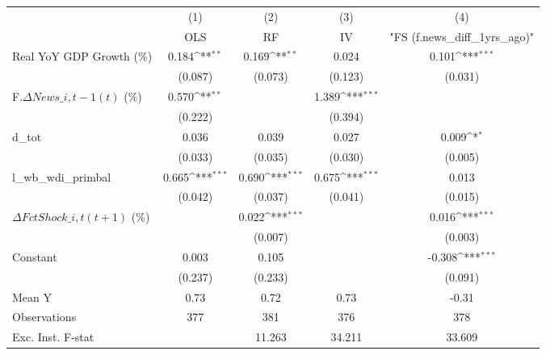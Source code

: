 {
\def\sym#1{\ifmmode^{#1}\else\(^{#1}\)\fi}
\begin{tabular}{l*{4}{c}}
\toprule
                    &\multicolumn{1}{c}{(1)}&\multicolumn{1}{c}{(2)}&\multicolumn{1}{c}{(3)}&\multicolumn{1}{c}{(4)}\\
                    &\multicolumn{1}{c}{OLS}&\multicolumn{1}{c}{RF}&\multicolumn{1}{c}{IV}&\multicolumn{1}{c}{ "FS (f.news\_diff\_1yrs\_ago)" }\\
\midrule
Real YoY GDP Growth (\%)&       0.184\sym{**} &       0.169\sym{**} &       0.024         &       0.101\sym{***}\\
                    &     (0.087)         &     (0.073)         &     (0.123)         &     (0.031)         \\
\addlinespace
F.$ \Delta News\_{i,t-1}(t)$ (\%)&       0.570\sym{**} &                     &       1.389\sym{***}&                     \\
                    &     (0.222)         &                     &     (0.394)         &                     \\
\addlinespace
d\_tot               &       0.036         &       0.039         &       0.027         &       0.009\sym{*}  \\
                    &     (0.033)         &     (0.035)         &     (0.030)         &     (0.005)         \\
\addlinespace
l\_wb\_wdi\_primbal    &       0.665\sym{***}&       0.690\sym{***}&       0.675\sym{***}&       0.013         \\
                    &     (0.042)         &     (0.037)         &     (0.041)         &     (0.015)         \\
\addlinespace
$ \Delta FctShock\_{i,t}(t+1)$ (\%)&                     &       0.022\sym{***}&                     &       0.016\sym{***}\\
                    &                     &     (0.007)         &                     &     (0.003)         \\
\addlinespace
Constant            &       0.003         &       0.105         &                     &      -0.308\sym{***}\\
                    &     (0.237)         &     (0.233)         &                     &     (0.091)         \\
\midrule
Mean Y              &        0.73         &        0.72         &        0.73         &       -0.31         \\
Observations        &         377         &         381         &         376         &         378         \\
Exc. Inst. F-stat   &                     &      11.263         &      34.211         &      33.609         \\
\bottomrule
\end{tabular}
}
